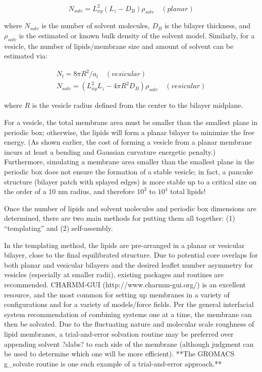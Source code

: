 \documentclass[9pt,bestpractices]{livecoms}
\begin{document}
\begin{equation}
	\label{e:partition}
	N_{solv} = L_{xy}^2 (L_z - D_B) \rho_{solv} \quad (planar)
\end{equation}

where $N_{solv}$ is the number of solvent molecules, $D_B$ is the bilayer thickness, and $\rho_{solv}$ is the estimated or known bulk density of the solvent model. Similarly, for a vesicle, the number of lipids/membrane size and amount of solvent can be estimated via:

\begin{subequations}
\begin{align}
N_l = 8 \pi R^2/a_l \quad (vesicular) \\
N_{solv} = (L_{xy}^2 L_z - 4\pi R^2 D_B) \rho_{solv} \quad (vesicular)
\end{align}
\end{subequations}

where $R$ is the vesicle radius defined from the center to the bilayer midplane.

For a vesicle, the total membrane area must be smaller than the smallest plane in periodic box; otherwise, the lipids will form a planar bilayer to minimize the free energy.
(As shown earlier, the cost of forming a vesicle from a planar membrane incurs at least a bending and Gaussian curvature energetic penalty.)
Furthermore, simulating a membrane area smaller than the smallest plane in the periodic box does not ensure the formation of a stable vesicle; in fact, a pancake structure (bilayer patch with splayed edges) is more stable up to a critical size on the order of a 10 nm radius, and therefore $10^3$ to $10^4$  total lipids!

Once the number of lipids and solvent molecules and periodic box dimensions are determined, there are two main methods for putting them all together: (1) ``templating'' and (2) self-assembly.

In the templating method, the lipids are pre-arranged in a planar or vesicular bilayer, close to the final equilibrated structure.
Due to potential core overlaps for both planar and vesicular bilayers and the desired leaflet number asymmetry for vesicles (especially at smaller radii), existing packages and routines are recommended.
CHARMM-GUI (http://www.charmm-gui.org/) is an excellent resource, and the most common for setting up membranes in a variety of configurations and for a variety of models/force fields.
Per the general interfacial system recommendation of combining systems one at a time, the membrane can then be solvated.
Due to the fluctuating nature and molecular scale roughness of lipid membranes, a trial-and-error solvation routine may be preferred over appending solvent ?slabs? to each side of the membrane (although judgment can be used to determine which one will be more efficient).
**The GROMACS g\_solvate routine is one such example of a trial-and-error approach.**
\end{document}
